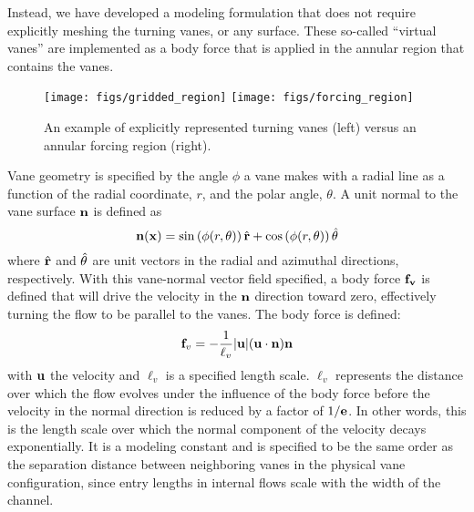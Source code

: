 
Instead, we have developed a modeling formulation that does not require
explicitly meshing the turning vanes, or any surface. These so-called
``virtual vanes'' are implemented as a body force that 
is applied in the annular region that contains the vanes. 

   \begin{figure}[!htb]
    \centering
    \texttt{[image: figs/gridded\_region]}
    \hfill
    \texttt{[image: figs/forcing\_region]}
     \caption{An example of explicitly represented turning vanes (left)
    versus an annular forcing region (right).}
     \label{fig:penalty_model}
   \end{figure}



Vane geometry is specified by the angle $\phi$ a vane makes with a
radial line as a function of the radial coordinate, $r$, and the polar
angle, $\theta$. A unit normal to the vane surface ${\bf n}$ is defined
as 
%
\begin{equation}
 {\bf n}({\bf x}) = \sin \left(\phi(r,\theta) \right) \hat{{\bf r}}+ \cos
  \left(\phi(r,\theta) \right) \hat{{\bf \theta}} 
\end{equation}
%
where $\hat{{\bf r}}$ and $\hat{{\bf \theta}}$ are unit
vectors in the radial and azimuthal directions, respectively.
With this vane-normal vector field specified, a body force ${\bf f_v}$
is defined
that will drive the velocity in the ${\bf n}$ direction toward zero,
effectively turning the flow to be parallel to the vanes. The body
force is defined:
\begin{equation}
 {\bf f}_v= -\frac{1}{\ell_v}|{\bf u}|({\bf u}\cdot{\bf n}){\bf n}
 \label{eqn:body_force}
\end{equation}
with ${\bf u}$ the velocity and $\ell_v$ is a specified length
scale. $\ell_v$ represents the distance over which the
flow evolves under the influence of the body force before the
velocity in the normal direction is reduced by a factor of $1/{\bf
e}$.
In other words, this is the length scale over which the
normal component of the velocity decays exponentially.
It is a modeling constant and is specified to be
the same order as the separation distance between neighboring vanes in
the physical vane configuration, since entry lengths in internal flows
scale with the width of the channel.

